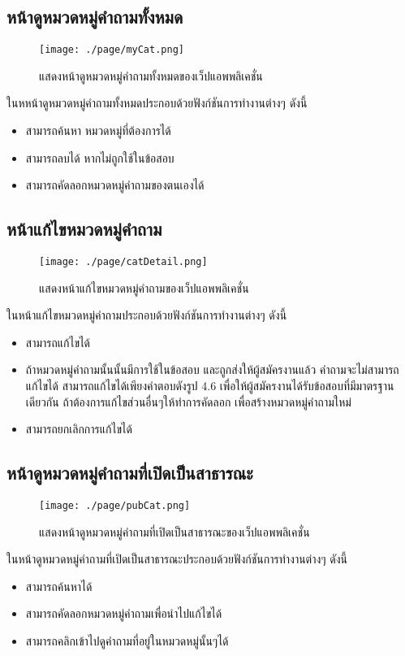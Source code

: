 \subsection{หน้าดูหมวดหมู่คำถามทั้งหมด}
\begin{figure}[H]
  \centering
  \texttt{[image: ./page/myCat.png]}
  \caption{แสดงหน้าดูหมวดหมู่คำถามทั้งหมดของเว็ปแอพพลิเคชั่น}
  \label{Fig:myCat}
\end{figure}
ในหหน้าดูหมวดหมู่คำถามทั้งหมดประกอบด้วยฟังก์ชันการทำงานต่างๆ ดังนี้
\begin{itemize}
  \item สามารถค้นหา หมวดหมู่ที่ต้องการได้
  \item สามารถลบได้ หากไม่ถูกใช้ในข้อสอบ
  \item สามารถคัดลอกหมวดหมู่คำถามของตนเองได้
\end{itemize}

\subsection{หน้าแก้ไขหมวดหมู่คำถาม}
\begin{figure}[H]
  \centering
  \texttt{[image: ./page/catDetail.png]}
  \caption{แสดงหน้าแก้ไขหมวดหมู่คำถามของเว็ปแอพพลิเคชั่น}
  \label{Fig:myCatDetails}
\end{figure}
ในหน้าแก้ไขหมวดหมู่คำถามประกอบด้วยฟังก์ชันการทำงานต่างๆ ดังนี้
\begin{itemize}
  \item สามารถแก้ไขได้
  \item ถ้าหมวดหมู่คำถามนั้นนั้นมีการใช้ในข้อสอบ และถูกส่งให้ผู้สมัครงานแล้ว คำถามจะไม่สามารถแก้ไขได้ สามารถแก้ไขได้เพียงคำตอบดังรูป 4.6 เพื่อให้ผู้สมัครงานได้รับข้อสอบที่มีมาตรฐานเดียวกัน ถ้าต้องการแก้ไขส่วนอื่นๆให้ทำการคัดลอก เพื่อสร้างหมวดหมู่คำถามใหม่
  \item สามารถยกเลิกการแก้ไขได้
\end{itemize}

\subsection{หน้าดูหมวดหมู่คำถามที่เปิดเป็นสาธารณะ}
\begin{figure}[H]
  \centering
  \texttt{[image: ./page/pubCat.png]}
  \caption{แสดงหน้าดูหมวดหมู่คำถามที่เปิดเป็นสาธารณะของเว็ปแอพพลิเคชั่น}
  \label{Fig:pubCats}
\end{figure}
ในหน้าดูหมวดหมู่คำถามที่เปิดเป็นสาธารณะประกอบด้วยฟังก์ชันการทำงานต่างๆ ดังนี้
\begin{itemize}
  \item สามารถค้นหาได้
  \item สามารถคัดลอกหมวดหมู่คำถามเพื่อนำไปแก้ไขได้
  \item สามารถคลิกเข้าไปดูคำถามที่อยู่ในหมวดหมู่นั้นๆได้
\end{itemize}

